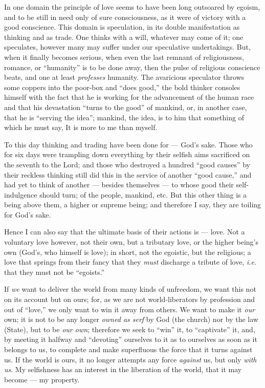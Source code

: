 In one domain the principle of love seems to have been long outsoared by 
egoism, and to be still in need only of sure consciousness, as it were of 
victory with a good conscience. This domain is speculation, in its double 
manifestation as thinking and as trade. One thinks with a will, whatever may 
come of it; one speculates, however many may suffer under our speculative 
undertakings. But, when it finally becomes serious, when even the last remnant 
of religiousness, romance, or ``humanity'' is to be done away, then the 
pulse of religious conscience beats, and one at least \textit{professes} 
humanity. The avaricious speculator throws some coppers into the poor-box and 
``does good,'' the bold thinker consoles himself with the fact that he is 
working for the advancement of the human race and that his devastation 
``turns to the good'' of mankind, or, in another case, that he is ``serving 
the idea''; mankind, the idea, is to him that something of which he must say, 
It is more to me than myself.

To this day thinking and trading have been done for --- God's sake. Those who 
for six days were trampling down everything by their selfish aims sacrificed 
on the seventh to the Lord; and those who destroyed a hundred ``good 
causes'' by their reckless thinking still did this in the service of another 
``good cause,'' and had yet to think of another --- besides themselves --- to 
whose good their self-indulgence should turn; of the people, mankind, etc. But 
this other thing is a being above them, a higher or supreme being; and 
therefore I say, they are toiling for God's sake.

Hence I can also say that the ultimate basis of their actions is --- love. Not 
a voluntary love however, not their own, but a tributary love, or the higher 
being's own (God's, who himself is love); in short, not the egoistic, but the 
religious; a love that springs from their fancy that they \textit{must} 
discharge a tribute of love, \textit{i.e.} that they must not be 
``egoists.''

If \textit{we} want to deliver the world from many kinds of unfreedom, we want 
this not on its account but on ours; for, as we are not world-liberators by 
profession and out of ``love,'' we only want to win it away from others. We 
want to make it \textit{our} own; it is not to be any longer \textit{owned as 
serf} by God (the church) nor by the law (State), but to be \textit{our own}; 
therefore we seek to ``win'' it, to ``captivate'' it, and, by meeting it 
halfway and ``devoting'' ourselves to it as to ourselves as soon as it 
belongs to us, to complete and make superfluous the force that it turns 
against us. If the world is ours, it no longer attempts any force 
\textit{against} us, but only \textit{with us}. My selfishness has an interest 
in the liberation of the world, that it may become --- my property.

